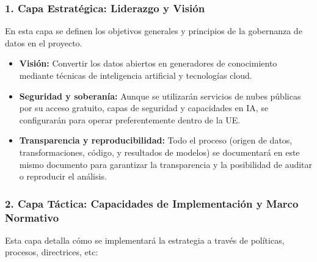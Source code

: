 \subsubsection*{1. Capa Estratégica: Liderazgo y Visión}

En esta capa se definen los objetivos generales y principios de la gobernanza de datos en el proyecto.

\begin{itemize}
	\item \textbf{Visión:} Convertir los datos abiertos en generadores de conocimiento mediante técnicas de inteligencia artificial y tecnologías cloud.
	
	\item \textbf{Seguridad y soberanía:} Aunque se utilizarán servicios de nubes públicas por su acceso gratuito, capas de seguridad y capacidades en IA, se configurarán para operar preferentemente dentro de la UE.
	
	\item \textbf{Transparencia y reproducibilidad:} Todo el proceso (origen de datos, transformaciones, código, y resultados de modelos) se documentará en este mismo documento para garantizar la transparencia y la posibilidad de auditar o reproducir el análisis.
\end{itemize}


\subsubsection*{2. Capa Táctica: Capacidades de Implementación y Marco Normativo}

Esta capa detalla cómo se implementará la estrategia a través de políticas, procesos, directrices, etc:

